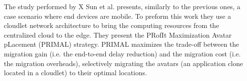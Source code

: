 \noindent\tab The study performed by X Sun et al. \cite{sun2016primal} presents, similarly to the previous ones, a case scenario where end devices are mobile. To preform this work they use a cloudlet network architecture to bring the computing resources from the centralized cloud to the edge. They present the PRofIt Maximization Avatar pLacement (PRIMAL) strategy. PRIMAL maximizes the trade-off between the migration gain (i.e. the end-to-end delay reduction) and the migration cost (i.e. the migration overheads), selectively migrating the avatars (an application clone located in a cloudlet) to their optimal locations. %

